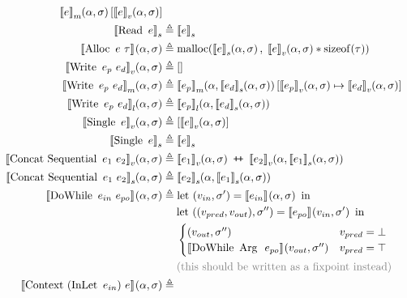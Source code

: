 \begin{align*}
  \denotefsub{m}{e}{\targ,\tmem}[\denotefv{e}{\targ,\tmem}]\\
%
\denotestate{\uop{Read}{e}} &\eqdef \denotestate{e}\\
%
\denotef{\bop{Alloc}{e}{\tau}}{\targ,\tmem} &\eqdef \operatorname{malloc}(\denotefs{e}{\targ,\tmem},\; \denotefv{e}{\targ,\tmem} * \operatorname{sizeof}(\tau))\\
%
\denotefv{\bop{Write}{e_p}{e_d}}{\targ,\tmem} &\eqdef []\\
%
\denotefsub{m}{\bop{Write}{e_p}{e_d}}{\targ,\tmem} &\eqdef
\denotefsub{m}{e_p}{\targ,\denotefs{e_d}{\targ,\tmem}}[\denotefv{e_p}{\targ,\tmem} \mapsto \denotefv{e_d}{\targ,\tmem}]\\
%
\denotefsub{l}{\bop{Write}{e_p}{e_d}}{\targ,\tmem} &\eqdef
\denotefsub{l}{e_p}{\targ,\denotefs{e_d}{\targ,\tmem}}\\
%
\denotefv{\uop{Single}e}{\targ,\tmem} &\eqdef [\denotefv{e}{\targ,\tmem}]\\
\denotestate{\uop{Single}e} &\eqdef \denotestate{e} \\
%
\denotefv{\bop{Concat\ Sequential}{e_1}{e_2}}{\targ,\tmem} &\eqdef
\append{\denotefv{e_1}{\targ,\tmem}}{\denotefv{e_2}{\targ,\denotefs{e_1}{\targ,\tmem}}}\\
%
\denotefs{\bop{Concat\ Sequential}{e_1}{e_2}}{\targ,\tmem} &\eqdef
\denotefs{e_2}{\targ,\denotefs{e_1}{\targ,\tmem}}\\
%
\denotef{\bop{DoWhile}{e_{in}}{e_{po}}}{\targ,\tmem} &\eqdef
\mathrm{let}\ (v_{in},\tmem') = \denotef{e_{in}}{\targ,\tmem}\ \mathrm{in}\\
&\hspace{1.3em}\mathrm{let}\ ((v_{pred}, v_{out}), \tmem'') = \denotef{e_{po}}{v_{in},\tmem'}\ \mathrm{in}\\
&\hspace{1.3em}\begin{cases}
   (v_{out}, \tmem'')
   & v_{pred} = \bot\\
   \denotef{\bop{DoWhile}{\mathrm{Arg}\ }{e_{po}}}{v_{out},\tmem''}
   & v_{pred} = \top\\
\end{cases}\\
&\hspace{1.3em}\text{\color{gray}(this should be written as a fixpoint instead)}\\
\denotef{\bop{Context}{(\uop{InLet}{e_{in}})}{e}}{\targ,\tmem} &\eqdef

\end{align*}
